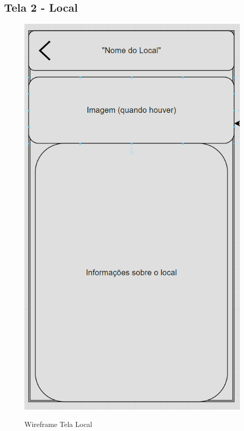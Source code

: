 \subsection{Tela 2 - Local}
\begin{figure}[h]
  \begin{center}
  \includegraphics[width=0.5\linewidth]{images/wire-tela-local.png}\\
  \end{center}
  \caption[Wireframe Tela Local]{Wireframe Tela Local}
  \label{fig:wireframe-tela-local}
\end{figure}
\clearpage
